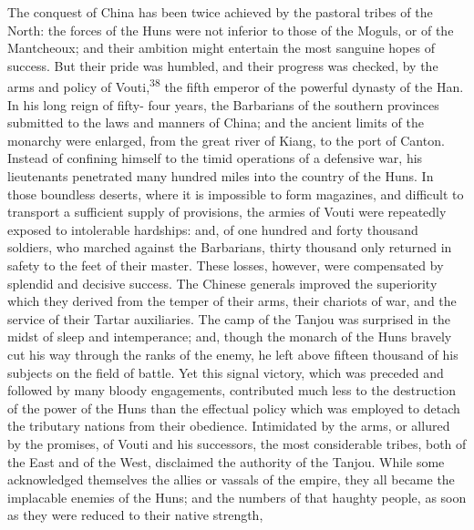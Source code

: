 

The conquest of China has been twice achieved by the pastoral
tribes of the North: the forces of the Huns were not inferior to
those of the Moguls, or of the Mantcheoux; and their ambition
might entertain the most sanguine hopes of success. But their
pride was humbled, and their progress was checked, by the arms
and policy of Vouti,\textsuperscript{38} the fifth emperor of the powerful dynasty
of the Han. In his long reign of fifty- four years, the
Barbarians of the southern provinces submitted to the laws and
manners of China; and the ancient limits of the monarchy were
enlarged, from the great river of Kiang, to the port of Canton.
Instead of confining himself to the timid operations of a
defensive war, his lieutenants penetrated many hundred miles into
the country of the Huns. In those boundless deserts, where it is
impossible to form magazines, and difficult to transport a
sufficient supply of provisions, the armies of Vouti were
repeatedly exposed to intolerable hardships: and, of one hundred
and forty thousand soldiers, who marched against the Barbarians,
thirty thousand only returned in safety to the feet of their
master. These losses, however, were compensated by splendid and
decisive success. The Chinese generals improved the superiority
which they derived from the temper of their arms, their chariots
of war, and the service of their Tartar auxiliaries. The camp of
the Tanjou was surprised in the midst of sleep and intemperance;
and, though the monarch of the Huns bravely cut his way through
the ranks of the enemy, he left above fifteen thousand of his
subjects on the field of battle. Yet this signal victory, which
was preceded and followed by many bloody engagements, contributed
much less to the destruction of the power of the Huns than the
effectual policy which was employed to detach the tributary
nations from their obedience. Intimidated by the arms, or allured
by the promises, of Vouti and his successors, the most
considerable tribes, both of the East and of the West, disclaimed
the authority of the Tanjou. While some acknowledged themselves
the allies or vassals of the empire, they all became the
implacable enemies of the Huns; and the numbers of that haughty
people, as soon as they were reduced to their native strength,
